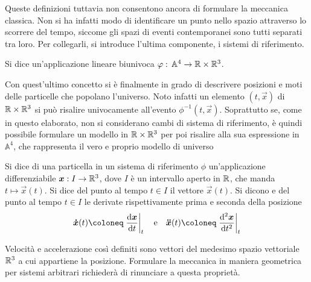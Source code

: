 Queste definizioni tuttavia non consentono ancora di formulare la meccanica classica. Non si ha infatti modo di identificare un punto nello spazio attraverso lo scorrere del tempo, siccome gli spazi di eventi contemporanei sono tutti separati tra loro. Per collegarli, si introduce l'ultima componente, i sistemi di riferimento.
\begin{definition}
  Si dice  un'applicazione lineare biunivoca $\varphi:\, \mathbb{A}^4 \to \mathbb{R}\times \mathbb{R}^3$. 
\end{definition}

Con quest'ultimo concetto si è finalmente in grado di descrivere posizioni e moti delle particelle che popolano l'universo. Noto infatti un elemento $(t,\vec{x})$ di $\mathbb{R} \times  \mathbb{R}^3$ si può risalire univocamente all'evento $\phi^{-1}(t,\vec{x})$. Soprattutto se, come in questo elaborato, non si considerano cambi di sistema di riferimento, è quindi possibile formulare un modello in $\mathbb{R} \times \mathbb{R}^3$ per poi risalire alla sua espressione in $\mathbb{A}^4$, che rappresenta il vero e proprio modello di universo
\begin{definition}
  Si dice  di una particella in un sistema di riferimento $\phi$ un'applicazione differenziabile $\boldsymbol{x}:I \to \mathbb{R}^3$, dove $I$ è un intervallo aperto in $\mathbb{R}$, che manda $t\mapsto \vec{x}(t)$. Si dice  del punto al tempo $t \in I$ il vettore $\vec{x}(t)$. Si dicono  e  del punto al tempo $t \in I$ le derivate rispettivamente prima e seconda della posizione \begin{equation}
  \vec{\dot{x}} (t) \defeq \eval{\dv{\vec{x}}{t}}_t \qqtext{e} \vec{\ddot{x}} (t) \defeq \eval{\dv[2]{\vec{x}}{t}}_t
  \end{equation} 
\end{definition}
\begin{remark}
  Velocità e accelerazione così definiti sono vettori del medesimo spazio vettoriale $\mathbb{R}^3$ a cui appartiene la posizione. Formulare la meccanica in maniera geometrica per sistemi arbitrari richiederà di rinunciare a questa proprietà.
\end{remark}

